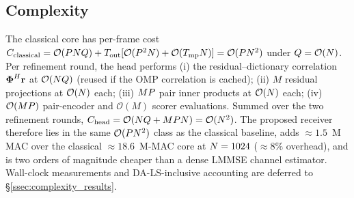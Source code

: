 \subsection{Complexity}
\label{ssec:complexity}
The classical core has per-frame cost
$C_\text{classical}=\mathcal{O}(PN Q)
+T_\text{out}[\mathcal{O}(P^2N)+\mathcal{O}(T_\text{mp}N)]
=\mathcal{O}(PN^2)$ under $Q=\mathcal{O}(N)$. Per
refinement round, the head performs (i) the residual--dictionary
correlation $\boldsymbol{\Phi}^H\mathbf{r}$ at $\mathcal{O}(N Q)$
(reused if the OMP correlation is cached); (ii) $M$ residual
projections at $\mathcal{O}(N)$ each; (iii) $MP$ pair inner
products at $\mathcal{O}(N)$ each; (iv) $\mathcal{O}(MP)$
pair-encoder and $\mathcal{O}(M)$ scorer evaluations. Summed over the
two refinement rounds, $C_\text{head}=\mathcal{O}(N Q + MP
N) = \mathcal{O}(N^2)$. The proposed receiver therefore lies
in the same $\mathcal{O}(PN^2)$ class as the classical
baseline, adds $\approx 1.5$~M MAC over the classical
$\approx 18.6$~M-MAC core at $N=1024$ ($\approx 8\%$ overhead), and
is two orders of magnitude cheaper than a dense LMMSE channel
estimator. Wall-clock measurements and DA-LS-inclusive accounting are deferred to
\S\ref{ssec:complexity_results}.
